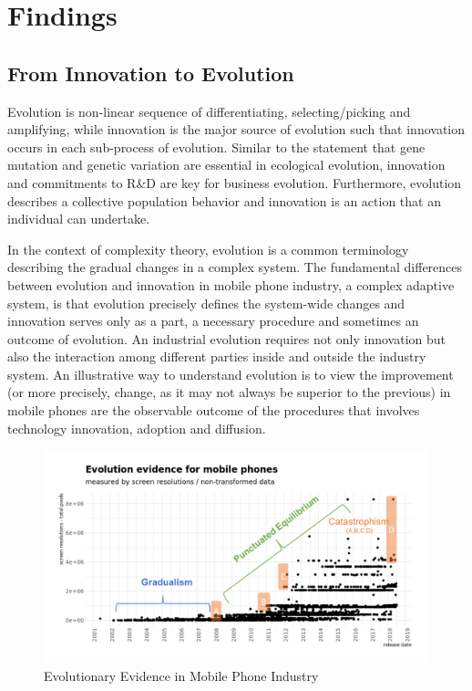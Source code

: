 \documentclass[utf8,english]{gradu3}
\begin{document}
\chapter{Findings}

\section{From Innovation to Evolution}

Evolution is non-linear sequence of differentiating, selecting/picking and amplifying, while innovation is the major source of evolution such that innovation occurs in each sub-process of evolution. Similar to the statement that gene mutation and genetic variation are essential in ecological evolution, innovation and commitments to R\&D are key for business evolution. Furthermore, evolution describes a collective population behavior and innovation is an action that an individual can undertake.

In the context of complexity theory, evolution is a common terminology describing the gradual changes in a complex system. The fundamental differences between evolution and innovation in mobile phone industry, a complex adaptive system, is that evolution precisely defines the system-wide changes and innovation serves only as a part, a necessary procedure and sometimes an outcome of evolution. An industrial evolution requires not only innovation but also the interaction among different parties inside and outside the industry system. An illustrative way to understand evolution is to view the improvement (or more precisely, change, as it may not always be superior to the previous) in mobile phones are the observable outcome of the procedures that involves technology innovation, adoption and diffusion.

\begin{figure}[htb]
    \centering
    \includegraphics[width=0.99\textwidth]{evo.png}
    \caption{Evolutionary Evidence in Mobile Phone Industry}
    \label{fig:evoMethods}
\end{figure}
\end{document}
